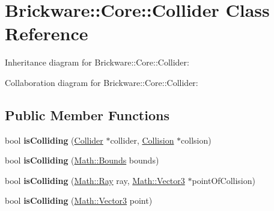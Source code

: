 \hypertarget{classBrickware_1_1Core_1_1Collider}{}\section{Brickware\+:\+:Core\+:\+:Collider Class Reference}
\label{classBrickware_1_1Core_1_1Collider}


Inheritance diagram for Brickware\+:\+:Core\+:\+:Collider\+:


Collaboration diagram for Brickware\+:\+:Core\+:\+:Collider\+:
\subsection*{Public Member Functions}
\begin{DoxyCompactItemize}
\item 
\hypertarget{classBrickware_1_1Core_1_1Collider_a4f8ff7d569c971faca7c2dbcdfeb927f}{}bool {\bfseries is\+Colliding} (\hyperlink{classBrickware_1_1Core_1_1Collider}{Collider} $\ast$collider, \hyperlink{classBrickware_1_1Core_1_1Collision}{Collision} $\ast$collsion)\label{classBrickware_1_1Core_1_1Collider_a4f8ff7d569c971faca7c2dbcdfeb927f}

\item 
\hypertarget{classBrickware_1_1Core_1_1Collider_a5f5f0096981918bb7c466dba0e4a6396}{}bool {\bfseries is\+Colliding} (\hyperlink{classBrickware_1_1Math_1_1Bounds}{Math\+::\+Bounds} bounds)\label{classBrickware_1_1Core_1_1Collider_a5f5f0096981918bb7c466dba0e4a6396}

\item 
\hypertarget{classBrickware_1_1Core_1_1Collider_a587be0b7a6e26c46b69a4f4adcef6e05}{}bool {\bfseries is\+Colliding} (\hyperlink{classBrickware_1_1Math_1_1Ray}{Math\+::\+Ray} ray, \hyperlink{classBrickware_1_1Math_1_1Vector3}{Math\+::\+Vector3} $\ast$point\+Of\+Collision)\label{classBrickware_1_1Core_1_1Collider_a587be0b7a6e26c46b69a4f4adcef6e05}

\item 
\hypertarget{classBrickware_1_1Core_1_1Collider_ab5fd1e0bb01a55d6bef03b11c4fa4031}{}bool {\bfseries is\+Colliding} (\hyperlink{classBrickware_1_1Math_1_1Vector3}{Math\+::\+Vector3} point)\label{classBrickware_1_1Core_1_1Collider_ab5fd1e0bb01a55d6bef03b11c4fa4031}

\end{DoxyCompactItemize}
